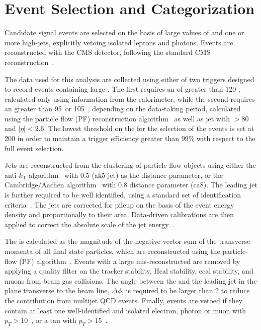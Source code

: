 \section{Event Selection and Categorization}\label{sec:selection}

Candidate signal events are selected on the basis of large values of \ETm and one or more high-\pt jets, 
explicitly vetoing isolated leptons and photons. Events are
reconstructed with the CMS detector, following the standard CMS reconstruction~\cite{CMSdetector}. 

The data used for this analysis are collected using either of two triggers designed to record events containing large \ETm. The first requires an \ETm of greater than 120 \gev, calculated only using information from the calorimeter, 
while the second requires an \ETm greater than 95~\gev or 105~\gev, depending on the data-taking period, calculated using  
the particle flow (PF) reconstruction algorithm~\cite{CMS-PAS-PFT-09-001} as well as jet with \pt$>80$ \gev and $|\eta|<2.6$. 
The lowest threshold on the \ETm for the selection of the events is set at 200 \gev in order to maintain a trigger efficiency greater than 
$99$\% with respect to the full event selection. 

Jets are reconstructed from the clustering of particle flow objects using either the 
anti-$k_{\textrm{T}}$ algorithm~\cite{Cacciari:2008gp} with 0.5 (ak5 jet) as the distance parameter,  
or the Cambridge/Aachen algorithm~\cite{cajets} with 0.8 distance
parameter (ca8). The leading jet is further required to be well
identified, using a standard set of identification criteria~\cite{jec}. The jets are corrected for pileup on the basis of the event energy density and 
proportionally to their area. Data-driven calibrations are then applied to correct the absolute scale of the jet energy~\cite{jec}.

The \ETm is calculated as the magnitude of the negative 
vector sum of the transverse momenta of all final state particles, which are reconstructed 
using the particle-flow (PF) algorithm~\cite{CMS-PAS-PFT-09-001}.
Events with a large mis-reconstructed \ETm are removed by applying a
quality filter on the tracker stability, Hcal stability, ecal
stability, and muons from beam gas collisions. 
The angle between the \ETm and the leading jet in the plane transverse to the beam line, $\Delta\phi$, is required to be larger than 2 to reduce the contribution from multijet QCD events. 
Finally, events are vetoed if they contain at least one well-identified and isolated electron, photon or muon with $p_T>10$~\gev, or a tau with $p_T>15$~\gev.

